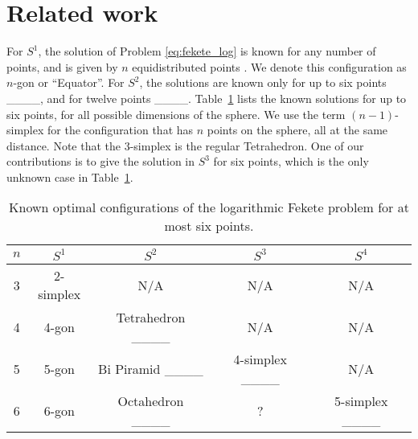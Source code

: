 \section{Related work}
For $S^1$, the solution of Problem \eqref{eq:fekete_log} is known for any number of points, and is given by $n$ equidistributed points \cite[Theorem 2.3.3]{borodachov2019}.
    We denote this configuration as $n$-gon or ``Equator''.
	For $S^2$, the solutions are known only for up to six points ____, and for twelve points ____.
	Table~\ref{tab:known_solutions} lists the known solutions for up to six points, for all possible dimensions of the sphere.
	We use the term $(n-1)$-simplex for the configuration that has $n$ points on the sphere, all at the same distance. Note that the 3-simplex is the regular Tetrahedron.
    One of our contributions is to give the solution in $S^3$ for six points, which is the only unknown case in Table~\ref{tab:known_solutions}.
	
	\begin{table}
    \centering
		\caption{Known optimal configurations of the logarithmic Fekete problem for at most six points.}
		\label{tab:known_solutions}
		\begin{tabular}{ccccc}
			\toprule
			$n$ & $S^1$ & $S^2$ & $S^3$ & $S^4$ \\
			\midrule
			3 & 2-simplex & N/A & N/A & N/A \\
			4 & 4-gon & Tetrahedron ____ & N/A & N/A \\
			5 & 5-gon & Bi Piramid ____ & 4-simplex ____ & N/A \\
			6 & 6-gon & Octahedron ____ & ? & 5-simplex ____ \\
			\bottomrule
		\end{tabular}
	\end{table}

